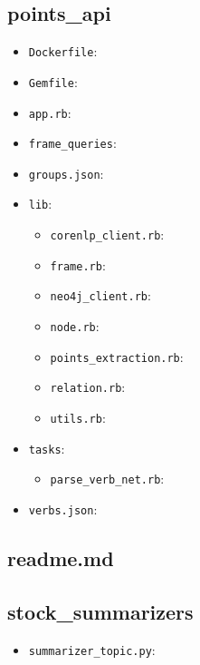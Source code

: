 \subsection*{points\_api}

\begin{itemize}

\item
  \texttt{Dockerfile}:
\item
  \texttt{Gemfile}:
\item
  \texttt{app.rb}:
\item
  \texttt{frame\_queries}:
\item
  \texttt{groups.json}:
\item
  \texttt{lib}:

  \begin{itemize}

  \item
    \texttt{corenlp\_client.rb}:
  \item
    \texttt{frame.rb}:
  \item
    \texttt{neo4j\_client.rb}:
  \item
    \texttt{node.rb}:
  \item
    \texttt{points\_extraction.rb}:
  \item
    \texttt{relation.rb}:
  \item
    \texttt{utils.rb}:
  \end{itemize}
\item
  \texttt{tasks}:

  \begin{itemize}

  \item
    \texttt{parse\_verb\_net.rb}:
  \end{itemize}
\item
  \texttt{verbs.json}:
\end{itemize}

\subsection*{readme.md}

\subsection*{stock\_summarizers}

\begin{itemize}

\item
  \texttt{summarizer\_topic.py}:
\end{itemize}

